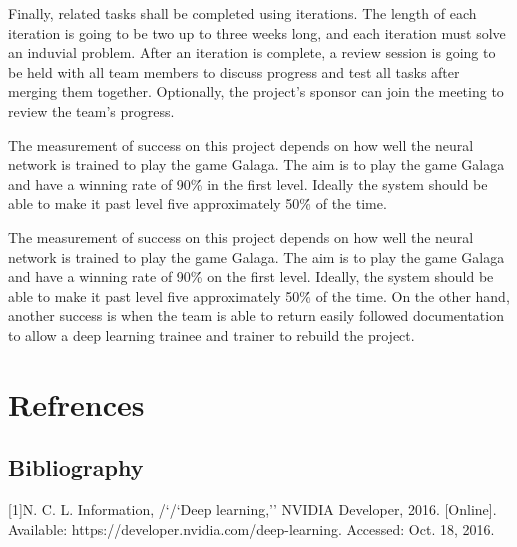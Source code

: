 \documentclass{scrreprt}
\begin{document}
Finally, related tasks shall be completed using iterations.
 The length of each iteration is going to be two up to three weeks long, and each iteration must solve an induvial problem.
 After an iteration is complete, a review session is going to be held with all team members to discuss progress and test all tasks after merging them together.
 Optionally, the project’s sponsor can join the meeting to review the team's progress.

The measurement of success on this project depends on how well the neural network is trained to play the game Galaga.
The aim is to play the game Galaga and have a winning rate of 90\'\% in the first level.
Ideally the system should be able to make it past level five approximately 50\'\% of the time.

The measurement of success on this project depends on how well the neural network is trained to play the game Galaga.
The aim is to play the game Galaga and have a winning rate of 90\'\% on the first level.
Ideally, the system should be able to make it past level five approximately 50\'\% of the time.
On the other hand, another success is when the team is able to return easily followed documentation to allow a deep learning trainee and trainer to rebuild the project.

\chapter{Refrences}
\section{Bibliography}
[1]N. C. L. Information, /`/`Deep learning,'' NVIDIA Developer, 2016. [Online]. Available: https://developer.nvidia.com/deep-learning. Accessed: Oct. 18, 2016.
\end{document}
